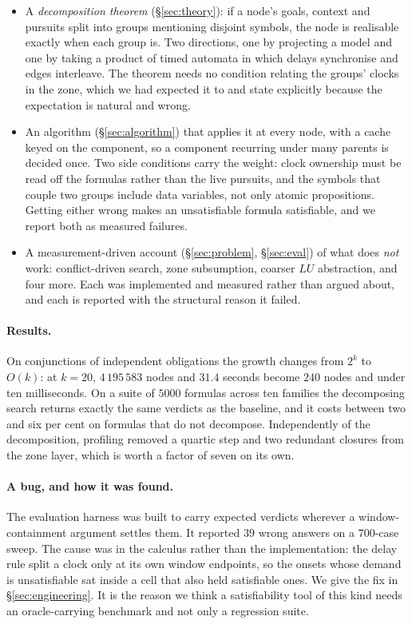 \begin{itemize}
\item A \emph{decomposition theorem} (\S\ref{sec:theory}): if a node's goals,
      context and pursuits split into groups mentioning disjoint symbols, the
      node is realisable exactly when each group is. Two directions, one by
      projecting a model and one by taking a product of timed automata in which
      delays synchronise and edges interleave. The theorem needs no condition
      relating the groups' clocks in the zone, which we had expected it to and
      state explicitly because the expectation is natural and wrong.
\item An algorithm (\S\ref{sec:algorithm}) that applies it at every node, with
      a cache keyed on the component, so a component recurring under many
      parents is decided once. Two side conditions carry the weight: clock
      ownership must be read off the formulas rather than the live pursuits,
      and the symbols that couple two groups include data variables, not only
      atomic propositions. Getting either wrong makes an unsatisfiable formula
      satisfiable, and we report both as measured failures.
\item A measurement-driven account (\S\ref{sec:problem}, \S\ref{sec:eval}) of
      what does \emph{not} work: conflict-driven search, zone subsumption,
      coarser $LU$ abstraction, and four more. Each was implemented and
      measured rather than argued about, and each is reported with the
      structural reason it failed.
\end{itemize}

\paragraph{Results.} On conjunctions of independent obligations the growth
changes from $2^{k}$ to $O(k)$: at $k=20$, $4\,195\,583$ nodes and $31.4$
seconds become $240$ nodes and under ten milliseconds. On a suite of $5000$
formulas across ten families the decomposing search returns exactly the same
verdicts as the baseline, and it costs between two and six per cent on formulas
that do not decompose. Independently of the decomposition, profiling removed a
quartic step and two redundant closures from the zone layer, which is worth a
factor of seven on its own.

\paragraph{A bug, and how it was found.} The evaluation harness was built to
carry expected verdicts wherever a window-containment argument settles them.
It reported $39$ wrong answers on a $700$-case sweep. The cause was in the
calculus rather than the implementation: the delay rule split a clock only at
its own window endpoints, so the onsets whose demand is unsatisfiable sat inside
a cell that also held satisfiable ones. We give the fix in
\S\ref{sec:engineering}. It is the reason we think a satisfiability tool of this
kind needs an oracle-carrying benchmark and not only a regression suite.
